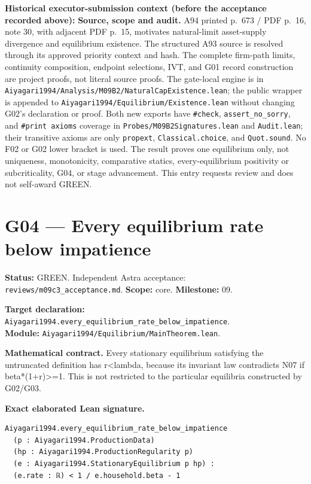 \documentclass[
  11pt,
]{article}
\let\LedgerOriginalTexttt\texttt
\renewcommand{\texttt}[1]{{\small\LedgerOriginalTexttt{#1}}}
\begin{document}
\textbf{Historical executor-submission context (before the acceptance
recorded above):} \textbf{Source, scope and audit.} A94 printed p.~673 /
PDF p.~16, note 30, with adjacent PDF p.~15, motivates natural-limit
asset-supply divergence and equilibrium existence. The structured A93
source is resolved through its approved priority context and hash. The
complete firm-path limits, continuity composition, endpoint selections,
IVT, and G01 record construction are project proofs, not literal source
proofs. The gate-local engine is in
\texttt{Aiyagari1994/Analysis/M09B2/NaturalCapExistence.lean}; the
public wrapper is appended to
\texttt{Aiyagari1994/Equilibrium/Existence.lean} without changing G02's
declaration or proof. Both new exports have \texttt{\#check},
\texttt{assert\_no\_sorry}, and \texttt{\#print\ axioms} coverage in
\texttt{Probes/M09B2Signatures.lean} and \texttt{Audit.lean}; their
transitive axioms are only \texttt{propext}, \texttt{Classical.choice},
and \texttt{Quot.sound}. No F02 or G02 lower bracket is used. The result
proves one equilibrium only, not uniqueness, monotonicity, comparative
statics, every-equilibrium positivity or subcriticality, G04, or stage
advancement. This entry requests review and does not self-award GREEN.

\section{G04 --- Every equilibrium rate below
impatience}\label{g04-every-equilibrium-rate-below-impatience}

\textbf{Status:} GREEN. Independent Astra acceptance:
\texttt{reviews/m09c3\_acceptance.md}. \textbf{Scope:} core.
\textbf{Milestone:} 09.

\textbf{Target declaration:}
\texttt{Aiyagari1994.every\_equilibrium\_rate\_below\_impatience}.\\
\textbf{Module:} \texttt{Aiyagari1994/Equilibrium/MainTheorem.lean}.

\textbf{Mathematical contract.} Every stationary equilibrium satisfying
the untruncated definition has r\textless lambda, because its invariant
law contradicts N07 if beta*(1+r)\textgreater=1. This is not restricted
to the particular equilibria constructed by G02/G03.

\textbf{Exact elaborated Lean signature.}

\begin{verbatim}
Aiyagari1994.every_equilibrium_rate_below_impatience
  (p : Aiyagari1994.ProductionData)
  (hp : Aiyagari1994.ProductionRegularity p)
  (e : Aiyagari1994.StationaryEquilibrium p hp) :
  (e.rate : ℝ) < 1 / e.household.beta - 1
\end{verbatim}
\end{document}
